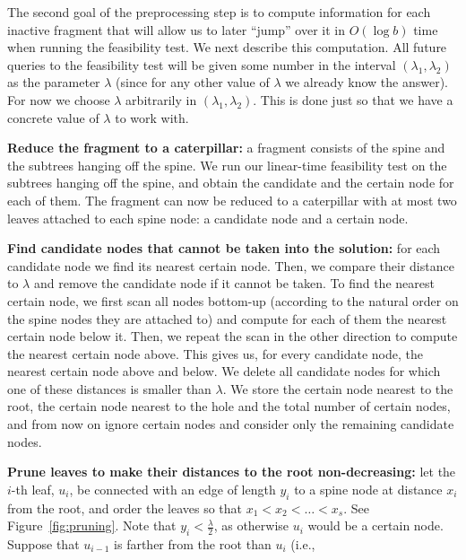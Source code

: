 \documentclass[11pt,a4paper]{article}
\newcounter{mycounter}
\newenvironment{noindlist}
 {\begin{list}{\arabic{mycounter}.~~}{\usecounter{mycounter} \labelsep=0em \labelwidth=0em \leftmargin=0em \itemindent=0em}}
 {\end{list}}
\theoremstyle{definition}
\theoremstyle{remark}
\begin{document}
The second goal of the preprocessing step is to
compute information for each inactive fragment that will allow us to later ``jump'' over it in $O(\log b)$ time when running the feasibility test.  We next describe this computation. All future queries to the feasibility test will be given some number in the interval $(\lambda_1,\lambda_2)$ as the parameter $\lambda$ (since for any other value of $\lambda$ we already know the answer). For now we choose $\lambda$ arbitrarily in
$(\lambda_1,\lambda_2)$. This is done just so that we have a concrete value of $\lambda$ to work with.%
\begin{noindlist}
\item\textbf{Reduce the fragment to a caterpillar:}
a fragment consists of the spine and the subtrees hanging off the spine. 
We run our linear-time feasibility test on the subtrees hanging off the spine, and obtain
the candidate and the certain node for each of them. The fragment can now be reduced to a caterpillar with at most two leaves attached to each
spine node: a candidate node and a certain node.
\item\label{removing certain nodes}
\textbf{Find candidate nodes that cannot be taken into the solution:}
for each candidate node we find its nearest certain node. Then, we compare their distance to $\lambda$ and remove the
candidate node if it cannot be taken. To find the nearest certain node, we first scan all nodes bottom-up (according to the natural order
on the spine nodes they are attached to) and compute for each of them the nearest certain node below it. Then, we repeat the scan
in the other direction to compute the nearest certain node above. This gives us, for every candidate node, the nearest certain node above
and below. We delete all candidate nodes for which one of these distances is smaller than $\lambda$.
We store the certain node nearest to the root, the certain node nearest to the hole and the total number of certain nodes,
and from now on ignore certain nodes and consider only the remaining candidate nodes.
\item\label{making distances from the root monotone}
\textbf{Prune leaves to make their distances to the root non-decreasing:}
let the $i$-th leaf, $u_{i}$, be connected with an edge of length $y_{i}$ to a spine node at distance $x_{i}$ from the root,
and order the leaves so that $x_{1}<x_{2}<\ldots<x_{s}$. See Figure~\ref{fig:pruning}.
Note that $y_{i}<\frac{\lambda}{2}$, as otherwise $u_{i}$ would be a certain node.
Suppose that $u_{i-1}$ is farther from the root than $u_i$ (i.e.,

\end{noindlist}
\end{document}
